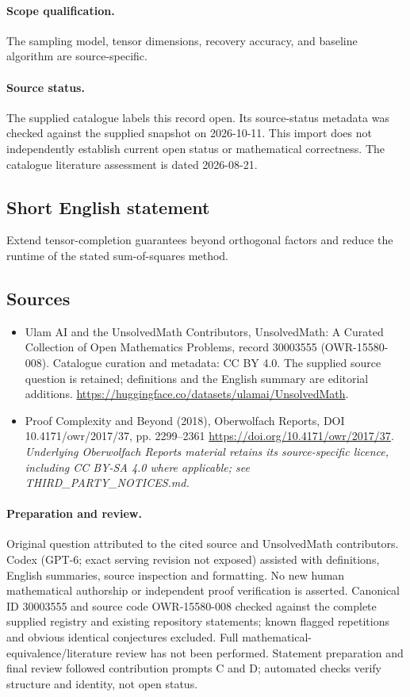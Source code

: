 \documentclass[11pt]{article}
\begin{document}
\paragraph{Scope qualification.}
The sampling model, tensor dimensions, recovery accuracy, and baseline algorithm are source-specific.
\paragraph{Source status.}
The supplied catalogue labels this record open. Its source-status metadata was checked against the supplied snapshot on 2026-10-11. This import does not independently establish current open status or mathematical correctness. The catalogue literature assessment is dated 2026-08-21.
\subsection{Short English statement}
Extend tensor-completion guarantees beyond orthogonal factors and reduce the runtime of the stated sum-of-squares method.
\subsection{Sources}
\begin{itemize}
\item[S1] Ulam AI and the UnsolvedMath Contributors, UnsolvedMath: A Curated Collection of Open Mathematics Problems, record 30003555 (OWR-15580-008). Catalogue curation and metadata: CC BY 4.0. The supplied source question is retained; definitions and the English summary are editorial additions.
\url{https://huggingface.co/datasets/ulamai/UnsolvedMath}.
\item[S2] Proof Complexity and Beyond (2018), Oberwolfach Reports, DOI 10.4171/owr/2017/37, pp. 2299--2361
\url{https://doi.org/10.4171/owr/2017/37}.
\textit{Underlying Oberwolfach Reports material retains its source-specific licence, including CC BY-SA 4.0 where applicable; see THIRD\_PARTY\_NOTICES.md.}
\end{itemize}
\paragraph{Preparation and review.}
Original question attributed to the cited source and UnsolvedMath contributors. Codex (GPT-6; exact serving revision not exposed) assisted with definitions, English summaries, source inspection and formatting. No new human mathematical authorship or independent proof verification is asserted. Canonical ID 30003555 and source code OWR-15580-008 checked against the complete supplied registry and existing repository statements; known flagged repetitions and obvious identical conjectures excluded. Full mathematical-equivalence/literature review has not been performed. Statement preparation and final review followed contribution prompts C and D; automated checks verify structure and identity, not open status.
\label{end:30003555}
\end{document}
